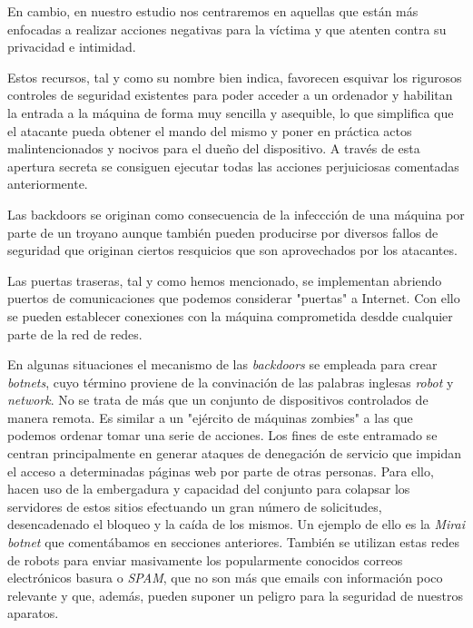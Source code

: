 \documentclass[12pt]{article}
\newcommand{\newpar} {
    \vskip 1cm
}
\begin{document}
            \newpar

            En cambio, en nuestro estudio nos centraremos en aquellas que están más enfocadas a realizar acciones negativas para la víctima y que atenten contra su privacidad e intimidad.

            \newpar

            Estos recursos, tal y como su nombre bien indica, favorecen esquivar los rigurosos controles de seguridad existentes para poder acceder a un ordenador y habilitan la entrada a la máquina de forma muy sencilla y asequible, lo que simplifica que el atacante pueda obtener el mando del mismo y poner en práctica actos malintencionados y nocivos para el dueño del dispositivo. A través de esta apertura secreta se consiguen ejecutar todas las acciones perjuiciosas comentadas anteriormente.

            \newpar

            Las backdoors se originan como consecuencia de la infeccción de una máquina por parte de un troyano aunque también pueden producirse por diversos fallos de seguridad que originan ciertos resquicios que son aprovechados por los atacantes.

            \newpar

            Las puertas traseras, tal y como hemos mencionado, se implementan abriendo puertos de comunicaciones que podemos considerar "puertas" a Internet. Con ello se pueden establecer conexiones con la máquina comprometida desdde cualquier parte de la red de redes.

            \newpar

            En algunas situaciones el mecanismo de las \textit{backdoors} se empleada para crear \textit{botnets}, cuyo término proviene de la convinación de las palabras inglesas \textit{robot} y \textit{network}. No se trata de más que un conjunto de dispositivos controlados de manera remota. Es similar a un "ejército de máquinas zombies" a las que podemos ordenar tomar una serie de acciones. Los fines de este entramado se centran principalmente en generar ataques de denegación de servicio que impidan el acceso a determinadas páginas web por parte de otras personas. Para ello, hacen uso de la embergadura y capacidad del conjunto para colapsar los servidores de estos sitios efectuando un gran número de solicitudes, desencadenado el bloqueo y la caída de los mismos. Un ejemplo de ello es la \textit{Mirai botnet} que comentábamos en secciones anteriores. También se utilizan estas redes de robots para enviar masivamente los popularmente conocidos correos electrónicos basura o \textit{SPAM}, que no son más que emails con información poco relevante y que, además, pueden suponer un peligro para la seguridad de nuestros aparatos.
\end{document}
